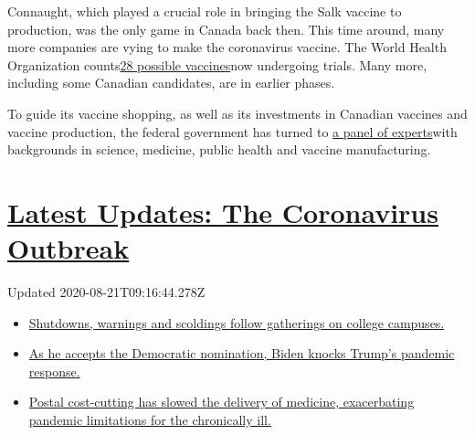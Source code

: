 Connaught, which played a crucial role in bringing the Salk vaccine to
production, was the only game in Canada back then. This time around,
many more companies are vying to make the coronavirus vaccine. The World
Health Organization
counts\href{https://www.who.int/publications/m/item/draft-landscape-of-covid-19-candidate-vaccines}{28
possible vaccines}now undergoing trials. Many more, including some
Canadian candidates, are in earlier phases.

To guide its vaccine shopping, as well as its investments in Canadian
vaccines and vaccine production, the federal government has turned to
\href{https://nrc.canada.ca/en/corporate/covid-19-vaccine-task-force}{a
panel of experts}with backgrounds in science, medicine, public health
and vaccine manufacturing.

\hypertarget{latest-updates-the-coronavirus-outbreak}{%
\section{\texorpdfstring{\href{https://www.nytimes3xbfgragh.onion/2020/08/21/world/covid-19-coronavirus.html?action=click\&pgtype=Article\&state=default\&region=MAIN_CONTENT_1\&context=storylines_live_updates}{Latest
Updates: The Coronavirus
Outbreak}}{Latest Updates: The Coronavirus Outbreak}}\label{latest-updates-the-coronavirus-outbreak}}

Updated 2020-08-21T09:16:44.278Z

\begin{itemize}
\tightlist
\item
  \href{https://www.nytimes3xbfgragh.onion/2020/08/21/world/covid-19-coronavirus.html?action=click\&pgtype=Article\&state=default\&region=MAIN_CONTENT_1\&context=storylines_live_updates\#link-4690b6aa}{Shutdowns,
  warnings and scoldings follow gatherings on college campuses.}
\item
  \href{https://www.nytimes3xbfgragh.onion/2020/08/21/world/covid-19-coronavirus.html?action=click\&pgtype=Article\&state=default\&region=MAIN_CONTENT_1\&context=storylines_live_updates\#link-324af071}{As
  he accepts the Democratic nomination, Biden knocks Trump's pandemic
  response.}
\item
  \href{https://www.nytimes3xbfgragh.onion/2020/08/21/world/covid-19-coronavirus.html?action=click\&pgtype=Article\&state=default\&region=MAIN_CONTENT_1\&context=storylines_live_updates\#link-1c47e0d0}{Postal
  cost-cutting has slowed the delivery of medicine, exacerbating
  pandemic limitations for the chronically ill.}
\end{itemize}

